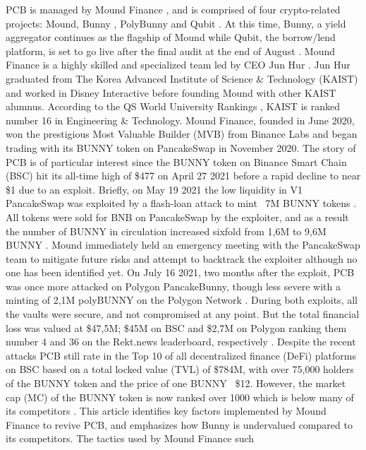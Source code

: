 \documentclass[12pt]{article}
\begin{document}
PCB is managed by Mound Finance \cite{mnd}, and is comprised of four crypto-related projects: Mound, Bunny \cite{pcb}, PolyBunny \cite{polyb} and Qubit \cite{qbt}. 
At this time, Bunny, a yield aggregator \cite{pcb_pool} continues as the flagship of Mound while Qubit, the borrow/lend platform, is set to go live after 
the final audit at the end of August \cite{qbt_live}. Mound Finance is a highly skilled and specialized team led by CEO Jun Hur \cite{junhur}. Jun Hur graduated 
from The Korea Advanced Institute of Science \& Technology (KAIST) and worked in Disney Interactive before founding Mound with 
other KAIST alumnus. According to the QS World University Rankings \cite{unirank}, KAIST is ranked number 16 in Engineering \& Technology. 
Mound Finance, founded in June 2020, won the prestigious Most Valuable Builder (MVB) from Binance Labs \cite{mvb} and began trading with 
its BUNNY \cite{bunny} token on PancakeSwap in November 2020. The story of PCB is of particular interest since the BUNNY token on Binance 
Smart Chain (BSC) hit its all-time high of \$477 on April 27 2021 before a rapid decline to near \$1 due to an exploit. Briefly, on May 
19 2021 the low liquidity in V1 PancakeSwap was exploited by a flash-loan attack to mint ~7M BUNNY tokens \cite{fl_attack}. All tokens were sold 
for BNB on PancakeSwap by the exploiter, and as a result the number of BUNNY in circulation increased sixfold from 1,6M to 9,6M BUNNY \cite{bunny_minted}. 
Mound immediately held an emergency meeting with the PancakeSwap team to mitigate future risks and attempt to backtrack the exploiter 
although no one has been identified yet. On July 16 2021, two months after the exploit, PCB was once more attacked on Polygon PancakeBunny, 
though less severe with a minting of 2,1M polyBUNNY on the Polygon Network \cite{polybunny_minted}. During both exploits, all the vaults were secure, and not 
compromised at any point. But the total financial loss was valued at \$47,5M; \$45M on BSC and \$2,7M on Polygon ranking them number 4 and 
36 on the Rekt.news leaderboard, respectively \cite{rekt_leaderboard}. Despite the recent attacks PCB still rate in the Top 10 of all decentralized finance (DeFi) platforms on 
BSC \cite{defistation} based on a total locked value (TVL) of \$784M, with over 75,000 holders of the BUNNY token and the price of one BUNNY ~\$12. However, the 
market cap (MC) of the BUNNY token is now ranked over 1000 which is below many of its competitors \cite{cmc}. This article identifies key factors implemented 
by Mound Finance to revive PCB, and emphasizes how Bunny is undervalued compared to its competitors. The tactics used by Mound Finance such 
\end{document}
